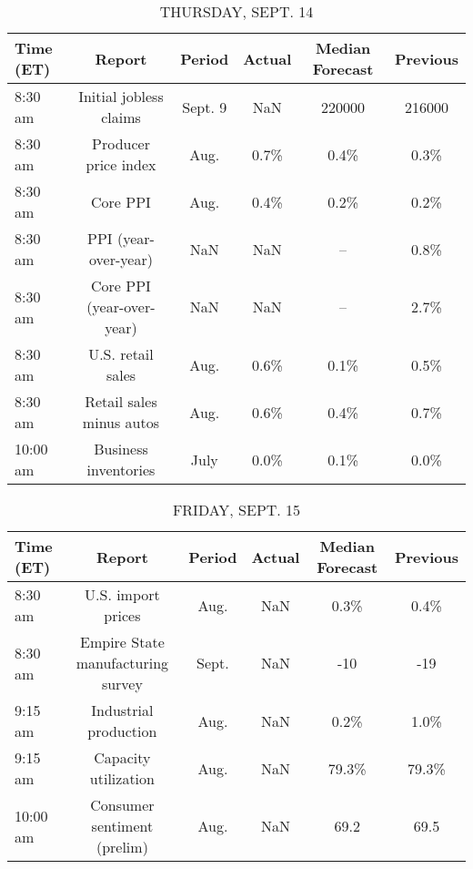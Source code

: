 \documentclass{article}%
\begin{document}
%


\begin{table}[htbp]%
\caption{THURSDAY, SEPT. 14}%
\centering%
\begin{adjustbox}{width=1\textwidth}%
\begin{tabular}{lccccc}
\toprule
Time (ET) &                    Report &  Period & Actual & Median Forecast & Previous \\
\midrule
  8:30 am &    Initial jobless claims & Sept. 9 &    NaN &          220000 &   216000 \\
  8:30 am &      Producer price index &    Aug. &   0.7\% &            0.4\% &     0.3\% \\
  8:30 am &                  Core PPI &    Aug. &   0.4\% &            0.2\% &     0.2\% \\
  8:30 am &      PPI (year-over-year) &     NaN &    NaN &              -- &     0.8\% \\
  8:30 am & Core PPI (year-over-year) &     NaN &    NaN &              -- &     2.7\% \\
  8:30 am &         U.S. retail sales &    Aug. &   0.6\% &            0.1\% &     0.5\% \\
  8:30 am &  Retail sales minus autos &    Aug. &   0.6\% &            0.4\% &     0.7\% \\
 10:00 am &      Business inventories &    July &   0.0\% &            0.1\% &     0.0\% \\
\bottomrule
\end{tabular}
%
\end{adjustbox}%
\end{table}

%


\begin{table}[htbp]%
\caption{FRIDAY, SEPT. 15}%
\centering%
\begin{adjustbox}{width=1\textwidth}%
\begin{tabular}{lccccc}
\toprule
Time (ET) &                            Report & Period & Actual & Median Forecast & Previous \\
\midrule
  8:30 am &                U.S. import prices &   Aug. &    NaN &            0.3\% &     0.4\% \\
  8:30 am & Empire State manufacturing survey &  Sept. &    NaN &             -10 &      -19 \\
  9:15 am &             Industrial production &   Aug. &    NaN &            0.2\% &     1.0\% \\
  9:15 am &              Capacity utilization &   Aug. &    NaN &           79.3\% &    79.3\% \\
 10:00 am &       Consumer sentiment (prelim) &   Aug. &    NaN &            69.2 &     69.5 \\
\bottomrule
\end{tabular}
%
\end{adjustbox}%
\end{table}
\end{document}
